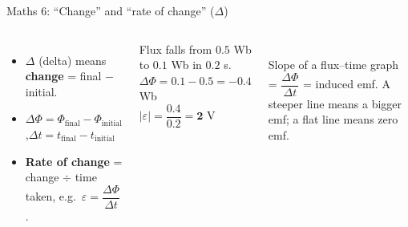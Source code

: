 \documentclass[aspectratio=169,11pt,xcolor=table]{beamer}
\begin{document}
\begin{frame}{Maths 6: ``Change'' and ``rate of change'' ($\Delta$)}
\begin{columns}[c]
\begin{itemize}
\item $\Delta$ (delta) means \textbf{change} = final $-$ initial.
\item $\Delta\Phi=\Phi_{\text{final}}-\Phi_{\text{initial}}$,\quad $\Delta t=t_{\text{final}}-t_{\text{initial}}$
\item \textbf{Rate of change} = change $\div$ time taken, e.g.\ $\varepsilon=\dfrac{\Delta\Phi}{\Delta t}$.
\end{itemize}
\begin{answer}[Example]
Flux falls from $0.5$ Wb to $0.1$ Wb in $0.2$ s.\\
$\Delta\Phi=0.1-0.5=-0.4$ Wb\\
$|\varepsilon|=\dfrac{0.4}{0.2}=\mathbf{2}$ V
\end{answer}
\centering
{}\\
{\small Slope of a flux--time graph = $\dfrac{\Delta\Phi}{\Delta t}$ = induced emf. A steeper line means a bigger emf; a flat line means zero emf.}
\end{columns}
\end{frame}
\end{document}
